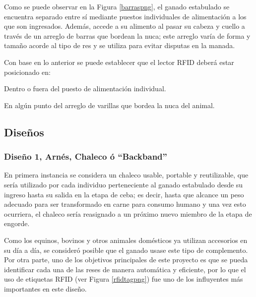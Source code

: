  Como se puede observar en la Figura \ref{barraspng}, el ganado estabulado se encuentra separado entre sí mediante puestos individuales de alimentación a los que son ingresados. Además, accede a su alimento al pasar su cabeza y cuello a través de un arreglo de barras que bordean la nuca; este arreglo varía de forma y tamaño acorde al tipo de res y se utiliza para evitar disputas en la manada.\\
 \begin{inparaenum}[(i)]
	        Con base en lo anterior se puede establecer que el lector RFID deberá estar posicionado en:
	        \item  Dentro o fuera del puesto de alimentación individual.
	        \item  En algún punto del arreglo de varillas que bordea la nuca del animal.
 \end{inparaenum}
 
 
\subsection{Diseños}
	\subsubsection{Diseño 1, Arnés, Chaleco ó ``Backband''}
	En primera instancia se considera un chaleco usable, portable y reutilizable, que sería utilizado por cada individuo perteneciente al ganado estabulado desde su ingreso hasta su salida en la etapa de ceba; es decir, hasta que alcance un peso adecuado para ser transformado en carne para consumo humano y una vez esto ocurriera, el chaleco sería reasignado a un próximo nuevo miembro de la etapa de engorde.
		
	Como los equinos, bovinos y otros animales domésticos ya utilizan accesorios en su día a día, se consideró posible que el ganado usase este tipo de complemento. Por otra parte, uno de los objetivos principales de este proyecto es que se pueda identificar cada una de las reses de manera automática y eficiente, por lo que el uso de etiquetas RFID (ver Figura \ref{rfidtagpng}) fue uno de los influyentes más importantes en este diseño.
	
